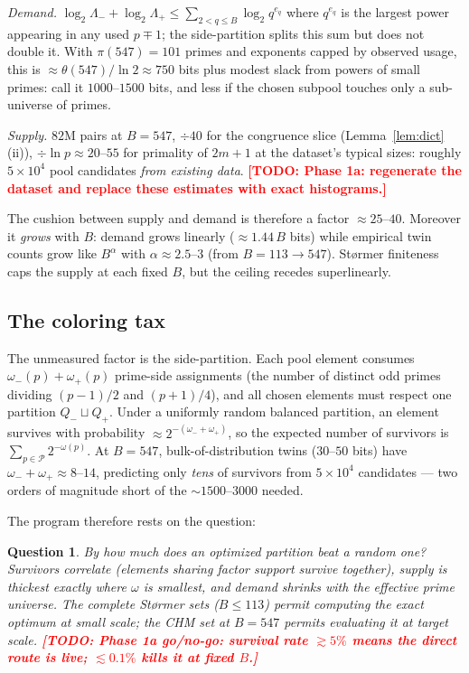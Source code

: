 \documentclass[11pt]{article}
\newtheorem{question}[theorem]{Question}
\theoremstyle{remark}
\newcommand{\todo}[1]{\textcolor{red}{\textbf{[TODO: #1]}}}
\newcommand{\cP}{\mathcal{P}}
\begin{document}
\emph{Demand.} $\log_2 \Lambda_- + \log_2 \Lambda_+ \le \sum_{2 < q \le B}
\log_2 q^{e_q}$ where $q^{e_q}$ is the largest power appearing in any used
$p \mp 1$; the side-partition splits this sum but does not double it. With
$\pi(547) = 101$ primes and exponents capped by observed usage, this is
$\approx \theta(547)/\ln 2 \approx 750$ bits plus modest slack from powers of
small primes: call it $1000$--$1500$ bits, and less if the chosen subpool
touches only a sub-universe of primes.

\emph{Supply.} $82$M pairs at $B = 547$, $\div 40$ for the congruence slice
(Lemma~\ref{lem:dict}(ii)), $\div \ln p \approx 20$--$55$ for primality of
$2m+1$ at the dataset's typical sizes: roughly $5 \times 10^4$ pool candidates
\emph{from existing data}. \todo{Phase 1a: regenerate the dataset and replace
these estimates with exact histograms.}

The cushion between supply and demand is therefore a factor $\approx 25$--$40$.
Moreover it \emph{grows} with $B$: demand grows linearly
($\approx 1.44\,B$ bits) while empirical twin counts grow like $B^{\alpha}$
with $\alpha \approx 2.5$--$3$ (from $B = 113 \to 547$). St\o rmer finiteness
caps the supply at each fixed $B$, but the ceiling recedes superlinearly.

\subsection{The coloring tax}\label{sec:coloring}

The unmeasured factor is the side-partition. Each pool element consumes
$\omega_-(p) + \omega_+(p)$ prime-side assignments (the number of distinct odd
primes dividing $(p-1)/2$ and $(p+1)/4$), and all chosen elements must respect
one partition $Q_- \sqcup Q_+$. Under a uniformly random balanced partition, an
element survives with probability $\approx 2^{-(\omega_- + \omega_+)}$, so the
expected number of survivors is $\sum_{p \in \cP} 2^{-\omega(p)}$. At $B=547$,
bulk-of-distribution twins ($30$--$50$ bits) have $\omega_- + \omega_+ \approx
8$--$14$, predicting only \emph{tens} of survivors from $5 \times 10^4$
candidates --- two orders of magnitude short of the $\sim$$1500$--$3000$
needed.

The program therefore rests on the question:

\begin{question}\label{q:coloring}
By how much does an \emph{optimized} partition beat a random one? Survivors
correlate (elements sharing factor support survive together), supply is
thickest exactly where $\omega$ is smallest, and demand shrinks with the
effective prime universe. The complete St\o rmer sets ($B \le 113$) permit
computing the exact optimum at small scale; the CHM set at $B = 547$ permits
evaluating it at target scale. \todo{Phase 1a go/no-go: survival rate
$\gtrsim 5\%$ means the direct route is live; $\lesssim 0.1\%$ kills it at
fixed $B$.}
\end{question}
\end{document}
